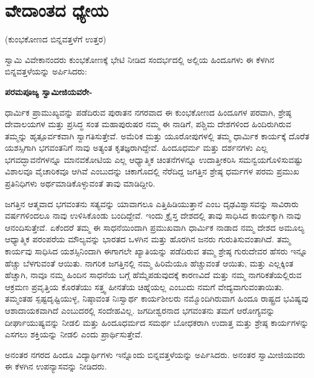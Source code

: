 
\chapter{ವೇದಾಂತದ ಧ್ಯೇಯ}

\begin{center}
(ಕುಂಭಕೋಣದ ಬಿನ್ನವತ್ತಳೆಗೆ ಉತ್ತರ)
\end{center}

ಸ್ವಾಮಿ ವಿವೇಕಾನಂದರು ಕುಂಭಕೋಣಕ್ಕೆ ಭೇಟಿ ನೀಡಿದ ಸಂದರ್ಭದಲ್ಲಿ ಅಲ್ಲಿಯ ಹಿಂದೂಗಳು ಈ ಕೆಳಗಿನ ಬಿನ್ನವತ್ತಳೆಯನ್ನು ಅರ್ಪಿಸಿದರು:

\textbf{ಪರಮಪೂಜ್ಯ ಸ್ವಾಮೀಜಿಯವರೇ-}

ಧಾರ್ಮಿಕ ಪ್ರಾಮುಖ್ಯವನ್ನು ಪಡೆದಿರುವ ಪುರಾತನ ನಗರವಾದ ಈ ಕುಂಭಕೋಣದ ಹಿಂದೂಗಳ ಪರವಾಗಿ, ಶ್ರೇಷ್ಠ ದೇವಾಲಯಗಳ ಮತ್ತು ಪ್ರಸಿದ್ಧ ಸಂತ ಮಹಾಪುರುಷರ ನಮ್ಮ ಈ ನಾಡಿಗೆ, ಪಶ್ಚಿಮ ದೇಶಗಳಿಂದ ಹಿಂದಿರುಗಿರುವ ತಮ್ಮನ್ನು ಹೃತ್ಪೂರ್ವಕವಾಗಿ ಸ್ವಾಗತಿಸುತ್ತೇವೆ. ಅಮೆರಿಕ ಮತ್ತು ಯೂರೋಪುಗಳಲ್ಲಿ ತಮ್ಮ ಧಾರ್ಮಿಕ ಕಾರ್ಯಕ್ಕೆ ದೊರೆತ ಯಶಸ್ಸಿಗಾಗಿ ಭಗವಂತನಿಗೆ ನಾವು ಅತ್ಯಂತ ಕೃತಜ್ಞರಾಗಿದ್ದೇವೆ. ಹಿಂದೂಧರ್ಮ ಮತ್ತು ದರ್ಶನಗಳು ಎಲ್ಲ ಭಗವದ್ಭಾವನೆಗಳನ್ನೂ ಮಾನವಕೋಟಿಯ ಎಲ್ಲ ಆಧ್ಯಾತ್ಮಿಕ ಚಿಂತನೆಗಳನ್ನೂ ಉದಾತ್ತೀಕರಿಸಿ ಸಮನ್ವಯಗೊಳಿಸುವಷ್ಟು ವಿಶಾಲವೂ ವೈಚಾರಿಕವೂ ಆಗಿವೆ ಎಂಬುದನ್ನು ಚಿಕಾಗೊದಲ್ಲಿ ನೆರೆದಿದ್ದ ಜಗತ್ತಿನ ಶ್ರೇಷ್ಠ ಧರ್ಮಗಳ ಪರಮ ಪ್ರಮುಖ ಪ್ರತಿನಿಧಿಗಳು ಅರ್ಥಮಾಡಿಕೊಳ್ಳುವಂತೆ ತಾವು ಮಾಡಿದ್ದೀರಿ.

ಜಗತ್ತಿನ ಆತ್ಮವಾದ ಭಗವಂತನು ಸತ್ಯವನ್ನು ಯಾವಾಗಲೂ ಎತ್ತಿಹಿಡಿಯುತ್ತಾನೆ ಎಂಬ ದೃಢವಿಶ್ವಾಸವನ್ನು ಸಾವಿರಾರು ವರ್ಷಗಳಿಂದಲೂ ನಾವು ಉಳಿಸಿಕೊಂಡು ಬಂದಿದ್ದೇವೆ. ಇಂದು ಕ್ರೈಸ್ತ ದೇಶದಲ್ಲಿ ತಾವು ಸಾಧಿಸಿದ ಕಾರ್ಯಕ್ಕಾಗಿ ನಾವು ಆನಂದಿಸುತ್ತೇವೆ. ಏಕೆಂದರೆ ತಮ್ಮ ಈ ಸಾಧನೆಯಿಂದಾಗಿ ಪ್ರಮುಖವಾಗಿ ಧಾರ್ಮಿಕ ನಾಡಾದ ನಮ್ಮ ದೇಶದ ಅಮೂಲ್ಯ ಆಧ್ಯಾತ್ಮಿಕ ಪರಂಪರೆಯ ಮೌಲ್ಯವನ್ನು ಭಾರತದ ಒಳಗಿನ ಮತ್ತು ಹೊರಗಿನ ಜನರು ಗುರುತಿಸುವಂತಾಗಿದೆ. ತಮ್ಮ ಕಾರ್ಯವು ಸಾಧಿಸಿದ ಯಶಸ್ಸಿನಿಂದಾಗಿ ಈಗಾಗಲೇ ಖ್ಯಾತಿಯನ್ನು ಪಡೆದಿರುವ ತಮ್ಮ ಶ್ರೇಷ್ಠ ಗುರುದೇವರ ಹೆಸರು ಇನ್ನೂ ಹೆಚ್ಚು ಬೆಳಗುವಂತೆ ಆಯಿತು. ನಾಗರಿಕ ಜಗತ್ತಿನಲ್ಲಿ ನಮ್ಮ ಹಿರಿಮೆಯೂ ಹೆಚ್ಚುವಂತೆ ಆಯಿತು, ಮತ್ತು ಎಲ್ಲಕ್ಕಿಂತ ಹೆಚ್ಚಾಗಿ, ನಾವೂ ನಮ್ಮ ಹಿಂದಿನ ಸಾಧನೆಯ ಬಗ್ಗೆ ಹೆಮ್ಮೆಪಡುವುದಕ್ಕೆ ಕಾರಣವಿದೆ ಮತ್ತು ನಮ್ಮ ನಾಗರಿಕತೆಯಲ್ಲಿರುವ ಆಕ್ರಮಣ ಪ್ರವೃತ್ತಿಯ ಕೊರತೆಯು ಸತ್ತ್ವ ಹೀನತೆಯ ಚಿಹ್ನೆಯಲ್ಲ ಎಂಬುದು ನಮಗೆ ವೇದ್ಯವಾಗುವಂತಾಯಿತು. ತಮ್ಮಂತಹ ಸ್ಪಷ್ಟದೃಷ್ಟಿಯುಳ್ಳ, ನಿಷ್ಠಾವಂತ ನಿಃಸ್ವಾರ್ಥ ಕಾರ್ಯಶೀಲರು ನಮ್ಮೊಂದಿಗಿರುವಾಗ ಹಿಂದೂ ರಾಷ್ಟ್ರದ ಭವಿಷ್ಯವು ಆಶಾದಾಯಕವಾಗಿದೆ ಎಂಬುದರಲ್ಲಿ ಸಂದೇಹವಿಲ್ಲ. ಜಗದೀಶ್ವರನಾದ ಭಗವಂತನು ತಮಗೆ ಆರೋಗ್ಯವನ್ನು ದೀರ್ಘಾಯುಷ್ಯವನ್ನು ನೀಡಲಿ ಮತ್ತು ಹಿಂದೂಧರ್ಮದ ಸಮರ್ಥ ಬೋಧಕರಾಗಿ ಉದಾತ್ತ ಮತ್ತು ಶ್ರೇಷ್ಠ ಕಾರ್ಯಗಳನ್ನು ಎಸಗಲು ಶಕ್ತಿಯನ್ನು ನೀಡಲಿ ಎಂದು ಪ್ರಾರ್ಥಿಸುತ್ತೇವೆ.

ಅನಂತರ ನಗರದ ಹಿಂದೂ ವಿದ್ಯಾರ್ಥಿಗಳು ಇನ್ನೊಂದು ಬಿನ್ನವತ್ತಳೆಯನ್ನು ಅರ್ಪಿಸಿದರು. ಅನಂತರ ಸ್ವಾಮೀಜಿಯವರು ಈ ಕೆಳಗಿನ ಉಪನ್ಯಾಸವನ್ನು ನೀಡಿದರು.

